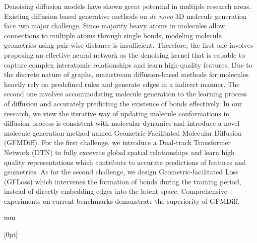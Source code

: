 \newpage                                                                                               %
\begin{center}
\heiti{}
\end{center}
\vskip 7mm

\begin{spacing}{1.5}
{\sihao Denoising diffusion models have shown great potential in multiple research areas. Existing diffusion-based generative methods on {\itshape de novo} 3D molecule generation face two major challenge. Since majority heavy atoms in molecules allow connections to multiple atoms through single bonds, modeling molecule geometries using pair-wise distance is insufficient. Therefore, the first one involves proposing an effective neural network as the denoising kernel that is capable to capture complex interatomic relationships and learn high-quality features. Due to the discrete nature of graphs, mainstream diffusion-based methods for molecules heavily rely on predefined rules and generate edges in a indirect manner. The second one involves accommodating molecule generation to the learning process of diffusion and accurately predicting the existence of bonds effectively. In our research, we view the iterative way of updating molecule conformations in diffusion process is consistent with molecular dynamics and introduce a novel molecule generation method named Geometric-Facilitated Molecular Diffusion (GFMDiff). For the first challenge, we introduce a Dual-track Transformer Network (DTN) to fully excevate global spatial relationships and learn high quality representations which contribute to accurate predictions of features and geometries. As for the second challenge, we design Geometric-facilitated Loss (GFLoss) which intervenes the formation of bonds during the training period, instead of directly embedding edges into the latent space. Comprehensive experiments on current benchmarks demonstrate the superiority of GFMDiff.}
\end{spacing}

 mm

\newpage
\begin{spacing}{1.5}
\tableofcontents
{}[0pt]{\addvspace{2pt}\filright}
{\contentspush{\thecontentslabel\ }}
{}{\contentspage}
\end{spacing}